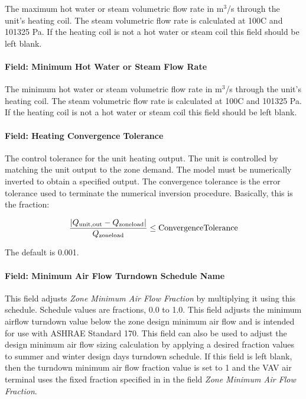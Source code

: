 The maximum hot water or steam volumetric flow rate in m\(^{3}\)/s through the unit's heating coil. The steam volumetric flow rate is calculated at 100C and 101325 Pa. If the heating coil is not a hot water or steam coil this field should be left blank.

\paragraph{Field: Minimum Hot Water or Steam Flow Rate}\label{field-minimum-hot-water-or-steam-flow-rate-2}

The minimum hot water or steam volumetric flow rate in m\(^{3}\)/s through the unit's heating coil. The steam volumetric flow rate is calculated at 100C and 101325 Pa. If the heating coil is not a hot water or steam coil this field should be left blank.

\paragraph{Field: Heating Convergence Tolerance}

The control tolerance for the unit heating output. The unit is controlled by matching the unit output to the zone demand. The model must be numerically inverted to obtain a specified output. The convergence tolerance is the error tolerance used to terminate the numerical inversion procedure. Basically, this is the fraction:

\begin{equation}
  \frac{\left| Q_{\rm{unit, out}} - Q_{\rm{zone load}} \right|}{Q_{\rm{zone load}}} \le \rm{ConvergenceTolerance}
\end{equation}


The default is 0.001.

\paragraph{Field: Minimum Air Flow Turndown Schedule Name}

This field adjusts \textit{Zone Minimum Air Flow Fraction} by multiplying it using this schedule. Schedule values are fractions, 0.0 to 1.0. This field adjusts the minimum airflow turndown value below the zone design minimum air flow and is intended for use with ASHRAE Standard 170. This field can also be used to adjust the design minimum air flow sizing calculation by applying a desired fraction values to summer and winter design days turndown schedule. If this field is left blank, then the turndown minimum air flow fraction value is set to 1 and the VAV air terminal uses the fixed fraction specified in in the field \textit{Zone Minimum Air Flow Fraction}.

